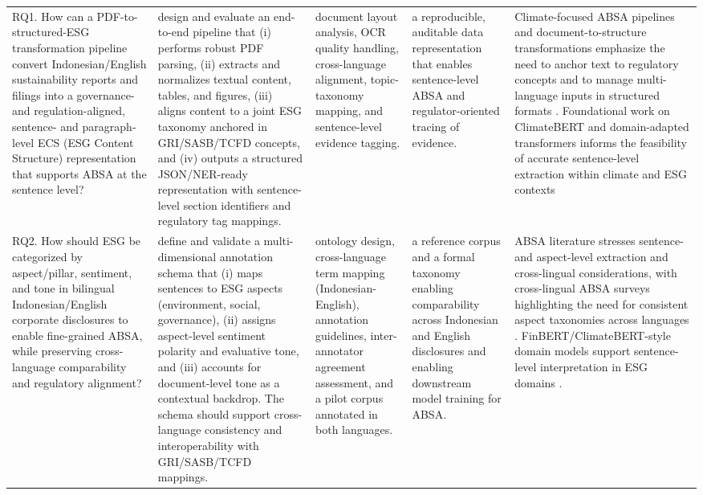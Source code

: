 \begin{landscape}
\begin{longtable}{p{6cm} p{6cm} p{4cm} p{3cm} p{6cm}}
RQ1. How can a PDF-to-structured-ESG transformation pipeline convert Indonesian/English sustainability reports and filings into a governance- and regulation-aligned, sentence- and paragraph-level ECS (ESG Content Structure) representation that supports ABSA at the sentence level? & design and evaluate an end-to-end pipeline that (i) performs robust PDF parsing, (ii) extracts and normalizes textual content, tables, and figures, (iii) aligns content to a joint ESG taxonomy anchored in GRI/SASB/TCFD concepts, and (iv) outputs a structured JSON/NER-ready representation with sentence-level section identifiers and regulatory tag mappings. & document layout analysis, OCR quality handling, cross-language alignment, topic-taxonomy mapping, and sentence-level evidence tagging. & a reproducible, auditable data representation that enables sentence-level ABSA and regulator-oriented tracing of evidence. & Climate-focused ABSA pipelines and document-to-structure transformations emphasize the need to anchor text to regulatory concepts and to manage multi-language inputs in structured formats \cite{10.21203/rs.3.rs-3600821/v1,10.2139/ssrn.3796152,10.1111/1911-3846.13069,10.1111/1911-3846.12832,10.1002/bse.4089,10.1371/journal.pone.0288052,10.1051/e3sconf/202343602004}. Foundational work on ClimateBERT and domain-adapted transformers informs the feasibility of accurate sentence-level extraction within climate and ESG contexts \cite{10.21203/rs.3.rs-3600821/v1,10.48550/arxiv.2510.01222,10.1111/1475-679x.12625,10.18653/v1/2023.emnlp-main.975} \\
\addlinespace
RQ2. How should ESG be categorized by aspect/pillar, sentiment, and tone in bilingual Indonesian/English corporate disclosures to enable fine-grained ABSA, while preserving cross-language comparability and regulatory alignment? & define and validate a multi-dimensional annotation schema that (i) maps sentences to ESG aspects (environment, social, governance), (ii) assigns aspect-level sentiment polarity and evaluative tone, and (iii) accounts for document-level tone as a contextual backdrop. The schema should support cross-language consistency and interoperability with GRI/SASB/TCFD mappings. & ontology design, cross-language term mapping (Indonesian-English), annotation guidelines, inter-annotator agreement assessment, and a pilot corpus annotated in both languages. & a reference corpus and a formal taxonomy enabling comparability across Indonesian and English disclosures and enabling downstream model training for ABSA. & ABSA literature stresses sentence- and aspect-level extraction and cross-lingual considerations, with cross-lingual ABSA surveys highlighting the need for consistent aspect taxonomies across languages \cite{10.1016/j.inffus.2025.103073,10.1111/eufm.12509,10.48550/arxiv.2511.00024,10.3390/math12193119,10.1002/csr.70089}. FinBERT/ClimateBERT-style domain models support sentence-level interpretation in ESG domains \cite{10.1111/1911-3846.12832,10.21203/rs.3.rs-3600821/v1,10.48550/arxiv.2510.01222}. \\

\end{longtable}
\end{landscape}
